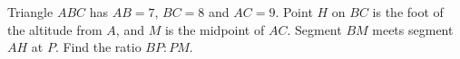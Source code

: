 Triangle $ABC$ has $AB=7$, $BC=8$ and $AC=9$. Point $H$ on $BC$ is the foot of the altitude from $A$, and $M$ is the midpoint of $AC$. Segment $BM$ meets segment $AH$ at $P$. Find the ratio $BP:PM$.

